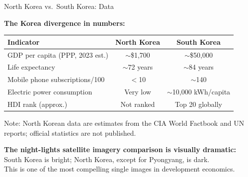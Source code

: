 \documentclass[10pt]{beamer}
\begin{document}
\begin{frame}{North Korea vs.\ South Korea: Data}

\textbf{The Korea divergence in numbers:}


\begin{center}
\begin{tabular}{lcc}
\toprule
\textbf{Indicator} & \textbf{North Korea} & \textbf{South Korea} \\
\midrule
GDP per capita (PPP, 2023 est.) & $\sim$\$1,700 & $\sim$\$50,000 \\
Life expectancy & $\sim$72 years & $\sim$84 years \\
Mobile phone subscriptions/100 & $<$10 & $\sim$140 \\
Electric power consumption & Very low & $\sim$10,000 kWh/capita \\
HDI rank (approx.) & Not ranked & Top 20 globally \\
\bottomrule
\end{tabular}
\end{center}


\footnotesize Note: North Korean data are estimates from the CIA World Factbook and UN reports; official statistics are not published.


\textbf{The night-lights satellite imagery comparison is visually dramatic:} South Korea is bright; North Korea, except for Pyongyang, is dark.\\
This is one of the most compelling single images in development economics.
\end{frame}
\end{document}
